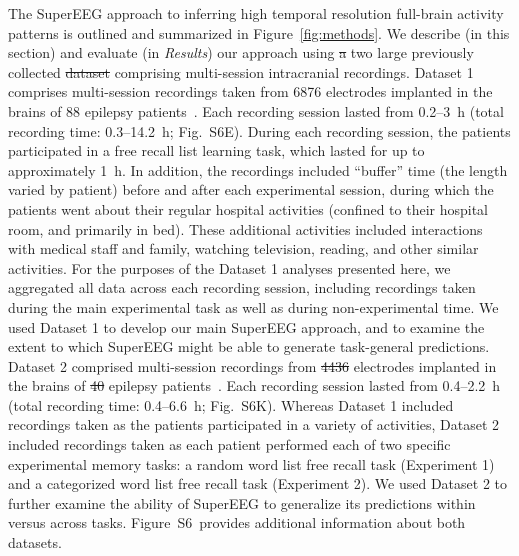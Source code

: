\documentclass[11pt]{article}
\newcommand{\suppstats}{S6} %
\providecommand{\DIFaddtex}[1]{{\protect\color{blue}\uwave{#1}}} %
\providecommand{\DIFdeltex}[1]{{\protect\color{red}\sout{#1}}}                      %
\providecommand{\DIFaddbegin}{} %
\providecommand{\DIFaddend}{} %
\providecommand{\DIFdelbegin}{} %
\providecommand{\DIFdelend}{} %
\providecommand{\DIFadd}[1]{\texorpdfstring{\DIFaddtex{#1}}{#1}} %
\providecommand{\DIFdel}[1]{\texorpdfstring{\DIFdeltex{#1}}{}} %
\newcommand{\DIFscaledelfig}{0.5}
\newlength{\DIFdelgraphicswidth} %
\newlength{\DIFdelgraphicsheight} %
\newcommand{\DIFaddincludegraphics}[2][]{{\color{blue}\fbox{\DIFOincludegraphics[#1]{#2}}}} %
\newcommand{\DIFdelincludegraphics}[2][]{%
\sbox{\DIFdelgraphicsbox}{\DIFOincludegraphics[#1]{#2}}%
\settoboxwidth{\DIFdelgraphicswidth}{\DIFdelgraphicsbox} %
\settoboxtotalheight{\DIFdelgraphicsheight}{\DIFdelgraphicsbox} %
\scalebox{\DIFscaledelfig}{%
\parbox[b]{\DIFdelgraphicswidth}{\usebox{\DIFdelgraphicsbox}\\[-\baselineskip] \rule{\DIFdelgraphicswidth}{0em}}\llap{\resizebox{\DIFdelgraphicswidth}{\DIFdelgraphicsheight}{%
\setlength{\unitlength}{\DIFdelgraphicswidth}%
\begin{picture}(1,1)%
\thicklines\linethickness{2pt} %
{\color[rgb]{1,0,0}\put(0,0){\framebox(1,1){}}}%
{\color[rgb]{1,0,0}\put(0,0){\line( 1,1){1}}}%
{\color[rgb]{1,0,0}\put(0,1){\line(1,-1){1}}}%
\end{picture}%
}\hspace*{3pt}}} %
} %
\DeclareRobustCommand{\DIFaddbegin}{\DIFOaddbegin \let\includegraphics\DIFaddincludegraphics} %
\DeclareRobustCommand{\DIFaddend}{\DIFOaddend \let\includegraphics\DIFOincludegraphics} %
\DeclareRobustCommand{\DIFdelbegin}{\DIFOdelbegin \let\includegraphics\DIFdelincludegraphics} %
\DeclareRobustCommand{\DIFdelend}{\DIFOaddend \let\includegraphics\DIFOincludegraphics} %
\begin{document}
\DIFaddend The SuperEEG approach to inferring high temporal resolution full-brain activity
patterns is outlined and summarized in Figure~\ref{fig:methods}. We describe (in
this section) and evaluate (in \textit{Results}) our approach using \DIFdelbegin \DIFdel{a }\DIFdelend two large
previously collected \DIFdelbegin \DIFdel{dataset }\DIFdelend \DIFaddbegin \DIFadd{datasets }\DIFaddend comprising multi-session intracranial recordings.
Dataset 1 comprises multi-session recordings taken from 6876 electrodes
implanted in the brains of 88 epilepsy patients~\citep{SedeEtal03, SedeEtal07a,
SedeEtal07b, MannEtal11, MannEtal12}.  Each recording session lasted from
0.2--3~h (total recording time: 0.3--14.2~h; Fig.~\suppstats E).  During each
recording session, the patients participated in a free recall list learning
task, which lasted for up to approximately 1~h.  In addition, the recordings
included ``buffer'' time (the length varied by patient) before and after each
experimental session, during which the patients went about their regular
hospital activities (confined to their hospital room, and primarily in bed).
These additional activities included interactions with medical staff and family,
watching television, reading, and other similar activities.  For the purposes of
the Dataset 1 analyses presented here, we aggregated all data across each
recording session, including recordings taken during the main experimental task
as well as during non-experimental time.  We used Dataset 1 to develop our main
SuperEEG approach, and to examine the extent to which SuperEEG might be able to
generate task-general predictions.  Dataset 2 comprised multi-session recordings
from \DIFdelbegin \DIFdel{4436
}\DIFdelend \DIFaddbegin \DIFadd{14860 }\DIFaddend electrodes implanted in the brains of \DIFdelbegin \DIFdel{40 }\DIFdelend \DIFaddbegin \DIFadd{131 }\DIFaddend epilepsy
patients~\citep{EzzyEtal17, HoraEtal17, KragEtal17, KuceEtal17, LinEtal17,
SoloEtal18, WeidEtal18, EzzyEtal18, KuceEtal18}.  Each recording session lasted
from 0.4--2.2~h (total recording time: 0.4--6.6~h; Fig.~\suppstats K).  Whereas
Dataset 1 included recordings taken as the patients participated in a variety of
activities, Dataset 2 included recordings taken as each patient performed each
of two specific experimental memory tasks: a random word list free recall task
(Experiment 1) and a categorized word list free recall task (Experiment 2).  We
used Dataset 2 to further examine the ability of SuperEEG to generalize its
predictions within versus across tasks.  Figure~\suppstats~provides additional
information about both datasets.
\end{document}
